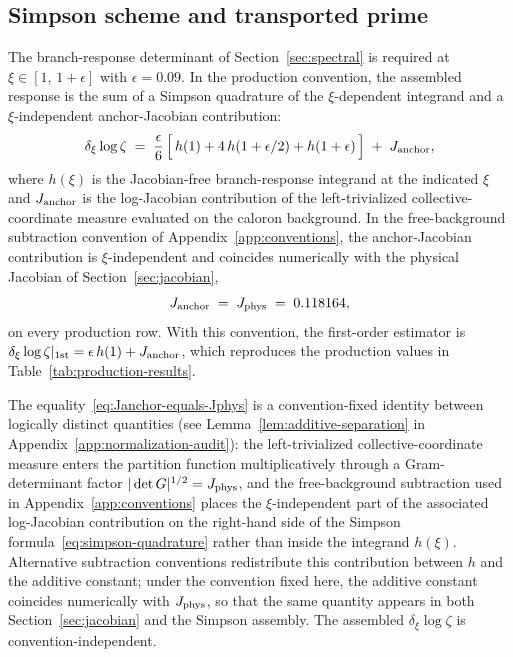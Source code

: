 \documentclass[a4paper,11pt]{article}
\theoremstyle{definition}
\newcommand{\Jphys}{J_{\rm phys}}
\begin{document}
\subsection{Simpson scheme and transported prime}
\label{subsec:simpson-setup}

The branch-response determinant of Section~\ref{sec:spectral} is
required at $\xi \in [1,\,1+\epsilon]$ with $\epsilon = 0.09$. In the
production convention, the assembled response is the sum of a Simpson
quadrature of the $\xi$-dependent integrand and a $\xi$-independent
anchor-Jacobian contribution:
\begin{equation}
\delta_\xi \log\zeta
\;=\;
\frac{\epsilon}{6}\,\Bigl[\,h(1) + 4\,h(1+\epsilon/2) + h(1+\epsilon)\,\Bigr]
\;+\; J_{\rm anchor},
\label{eq:simpson-quadrature}
\end{equation}
where $h(\xi)$ is the Jacobian-free branch-response integrand at the
indicated $\xi$ and $J_{\rm anchor}$ is the log-Jacobian contribution
of the left-trivialized collective-coordinate measure evaluated on the
caloron background. In the free-background subtraction convention of
Appendix~\ref{app:conventions}, the anchor-Jacobian contribution is
$\xi$-independent and coincides numerically with the physical
Jacobian of Section~\ref{sec:jacobian},
\begin{equation}
J_{\rm anchor} \;=\; \Jphys \;=\; 0.118164,
\label{eq:Janchor-equals-Jphys}
\end{equation}
on every production row. With this convention, the first-order
estimator is $\delta_\xi \log\zeta|_{\rm 1st} = \epsilon\,h(1) +
J_{\rm anchor}$, which reproduces the production values in
Table~\ref{tab:production-results}.

The equality~\eqref{eq:Janchor-equals-Jphys} is a convention-fixed identity between logically distinct quantities (see Lemma~\ref{lem:additive-separation} in Appendix~\ref{app:normalization-audit}): the left-trivialized collective-coordinate measure
enters the partition function multiplicatively through a
Gram-determinant factor $|\det G|^{1/2} = \Jphys$, and the
free-background subtraction used in Appendix~\ref{app:conventions}
places the $\xi$-independent part of the associated log-Jacobian
contribution on the right-hand side of the Simpson
formula~\eqref{eq:simpson-quadrature} rather than inside the
integrand $h(\xi)$. Alternative subtraction conventions redistribute
this contribution between $h$ and the additive constant; under the
convention fixed here, the additive constant coincides numerically
with $\Jphys$, so that the same quantity appears in both
Section~\ref{sec:jacobian} and the Simpson assembly. The assembled
$\delta_\xi \log\zeta$ is convention-independent.
\end{document}
